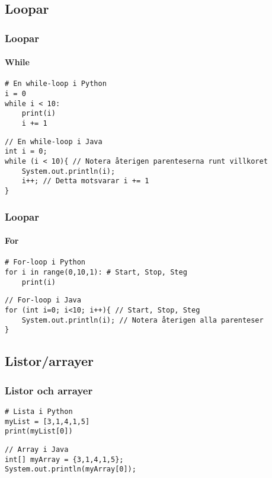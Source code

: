 \documentclass[aspectratio=169]{beamer}
\begin{document}
\subsection{Loopar}

\begin{frame}[fragile]
    \frametitle{Loopar}
    \framesubtitle{While}

    \begin{lstlisting}[style=python]
# En while-loop i Python
i = 0
while i < 10:
    print(i)
    i += 1
    \end{lstlisting}

    \begin{lstlisting}[style=java]
// En while-loop i Java
int i = 0;
while (i < 10){ // Notera återigen parenteserna runt villkoret
    System.out.println(i);
    i++; // Detta motsvarar i += 1
}
    \end{lstlisting}

\end{frame}

\begin{frame}[fragile]
    \frametitle{Loopar}
    \framesubtitle{For}

    \begin{lstlisting}[style=python]
# For-loop i Python
for i in range(0,10,1): # Start, Stop, Steg
    print(i)
    \end{lstlisting}

    \begin{lstlisting}[style=java]
// For-loop i Java
for (int i=0; i<10; i++){ // Start, Stop, Steg
    System.out.println(i); // Notera återigen alla parenteser
}
    \end{lstlisting}

\end{frame}

\subsection{Listor/arrayer}

\begin{frame}[fragile]
    \frametitle{Listor och arrayer}

    \begin{lstlisting}[style=python]
# Lista i Python
myList = [3,1,4,1,5]
print(myList[0])
    \end{lstlisting}

    \begin{lstlisting}[style=java]
// Array i Java
int[] myArray = {3,1,4,1,5};
System.out.println(myArray[0]);
    \end{lstlisting}

\end{frame}
\end{document}
